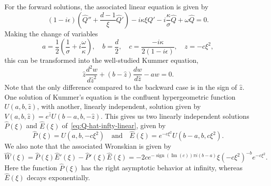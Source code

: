 \documentclass[11pt]{article}
\DeclareMathOperator{\imag}{Im}
\DeclareMathOperator{\sign}{sign}
\begin{document}
For the forward solutions, the associated linear equation is given by
\begin{equation}\label{eq:Q-hat-infty-linear}
  (1 - i\epsilon)\left(\hat{Q}'' + \frac{d - 1}{\xi}\hat{Q}'\right) - i\kappa\xi \hat{Q}' - i \frac{\kappa}{\sigma}\hat{Q} + \omega \hat{Q} = 0.
\end{equation}
Making the change of variables
\begin{equation}
  \label{eq:abc}
  a = \frac{1}{2}\left(\frac{1}{\sigma} + i \frac{\omega}{\kappa}\right),\quad
  b = \frac{d}{2},\quad
  c = \frac{-i \kappa}{2(1 - i\epsilon)},\quad
  \hat{z} = -c\xi^{2},
\end{equation}
this can be transformed into the well-studied Kummer equation,
\begin{equation*}
  \hat{z} \frac{d^{2}w}{d\hat{z}^{2}} + (b - \hat{z})\frac{dw}{d\hat{z}} - aw = 0.
\end{equation*}
Note that the only difference compared to the backward case is in the
sign of \(\hat{z}\). One solution of Kummer's equation is the
confluent hypergeometric function \(U(a, b, \hat{z})\), with another,
linearly independent, solution given by
\(V(a, b, \hat{z}) = e^{\hat{z}}U(b - a, b, -\hat{z})\). This gives us
two linearly independent solutions \(\hat{P}(\xi)\) and
\(\hat{E}(\xi)\) of~\eqref{eq:Q-hat-infty-linear}, given by
\begin{equation*}
  \hat{P}(\xi) = U(a, b, -c\xi^{2}) \quad\text{and}\quad
  \hat{E}(\xi) = e^{-c\xi^{2}}U(b - a, b, c\xi^{2}).
\end{equation*}
We also note that the associated Wronskian is given by
\begin{equation*}
  \hat{W}(\xi) = \hat{P}(\xi)\hat{E}'(\xi) - \hat{P}'(\xi)\hat{E}(\xi) = -2ce^{-\sign(\imag(c)) \pi i (b - a)}\xi \left(-c\xi^{2}\right)^{-b}e^{-c\xi^{2}}.
\end{equation*}
Here the function \(\hat{P}(\xi)\) has the right asymptotic behavior
at infinity, whereas \(\hat{E}(\xi)\) decays exponentially.
\end{document}
